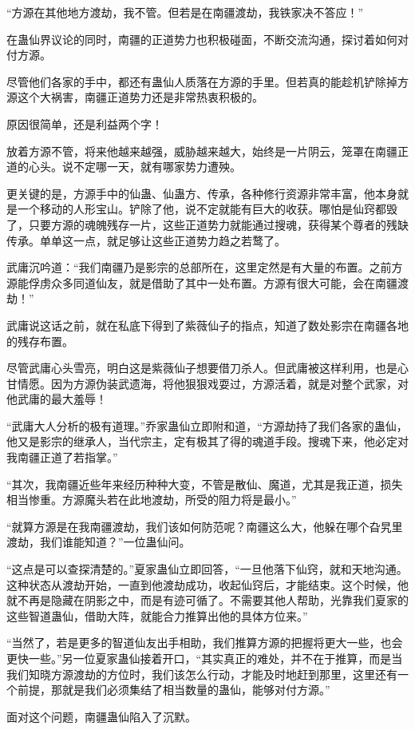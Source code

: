 \begin{this_body}
“方源在其他地方渡劫，我不管。但若是在南疆渡劫，我铁家决不答应！”

在蛊仙界议论的同时，南疆的正道势力也积极碰面，不断交流沟通，探讨着如何对付方源。

尽管他们各家的手中，都还有蛊仙人质落在方源的手里。但若真的能趁机铲除掉方源这个大祸害，南疆正道势力还是非常热衷积极的。

原因很简单，还是利益两个字！

放着方源不管，将来他越来越强，威胁越来越大，始终是一片阴云，笼罩在南疆正道的心头。说不定哪一天，就有哪家势力遭殃。

更关键的是，方源手中的仙蛊、仙蛊方、传承，各种修行资源非常丰富，他本身就是一个移动的人形宝山。铲除了他，说不定就能有巨大的收获。哪怕是仙窍都毁了，只要方源的魂魄残存一片，这些正道势力就能通过搜魂，获得某个尊者的残缺传承。单单这一点，就足够让这些正道势力趋之若鹜了。

武庸沉吟道：“我们南疆乃是影宗的总部所在，这里定然是有大量的布置。之前方源能俘虏众多同道仙友，就是借助了其中一处布置。方源有很大可能，会在南疆渡劫！”

武庸说这话之前，就在私底下得到了紫薇仙子的指点，知道了数处影宗在南疆各地的残存布置。

尽管武庸心头雪亮，明白这是紫薇仙子想要借刀杀人。但武庸被这样利用，也是心甘情愿。因为方源伪装武遗海，将他狠狠戏耍过，方源活着，就是对整个武家，对他武庸的最大羞辱！

“武庸大人分析的极有道理。”乔家蛊仙立即附和道，“方源劫持了我们各家的蛊仙，他又是影宗的继承人，当代宗主，定有极其了得的魂道手段。搜魂下来，他必定对我南疆正道了若指掌。”

“其次，我南疆近些年来经历种种大变，不管是散仙、魔道，尤其是我正道，损失相当惨重。方源魔头若在此地渡劫，所受的阻力将是最小。”

“就算方源是在我南疆渡劫，我们该如何防范呢？南疆这么大，他躲在哪个旮旯里渡劫，我们谁能知道？”一位蛊仙问。

“这点是可以查探清楚的。”夏家蛊仙立即回答，“一旦他落下仙窍，就和天地沟通。这种状态从渡劫开始，一直到他渡劫成功，收起仙窍后，才能结束。这个时候，他就不再是隐藏在阴影之中，而是有迹可循了。不需要其他人帮助，光靠我们夏家的这些智道蛊仙，借助大阵，就能合力推算出他的具体方位来。”

“当然了，若是更多的智道仙友出手相助，我们推算方源的把握将更大一些，也会更快一些。”另一位夏家蛊仙接着开口，“其实真正的难处，并不在于推算，而是当我们知晓方源渡劫的方位时，我们该怎么行动，才能及时地赶到那里，这里还有一个前提，那就是我们必须集结了相当数量的蛊仙，能够对付方源。”

面对这个问题，南疆蛊仙陷入了沉默。


\end{this_body}
